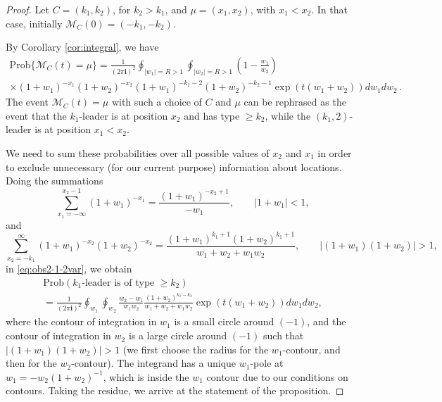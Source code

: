 \documentclass[11pt,reqno]{amsart}
\theoremstyle{definition}
\theoremstyle{remark}
\theoremstyle{remark}
\def\geq{\geqslant}
\renewcommand\ge{\geq}
\def\M{\mathcal M}
\newcommand{\ii}{{\mathbf i}}
\numberwithin{equation}{section}
\begin{document}
	\begin{proof}
		
		Let $C=(k_1, k_2)$, for $k_2>k_1$, and $\mu = (x_1,x_2)$, with $x_1<x_2$. In that case, initially $\M_C(0)= (-k_1, -k_2)$. 
		
		By Corollary \ref{cor:integral}, we have
		\begin{equation}\label{eq:obs2-1-2var}
			\begin{gathered}
				\mathrm{Prob}\{\M_C(t)=\mu\}=\frac{1}{(2\pi \ii)^2} \oint_{|w_1|=R>1} \oint_{|w_2|=R>1} \left(1-\frac{w_1}{w_2}\right) \\ \times (1+w_1)^{-x_1} (1+w_2)^{-x_2} 
				(1+w_1)^{-k_1-2} (1+w_2)^{-k_2-1} \exp (t (w_1+w_2)) d w_1 d w_2 \,.
			\end{gathered}
		\end{equation}
		The event $\M_C(t)=\mu$ with such a choice of $C$ and $\mu$ can be rephrased as the event that the $k_1$-leader is at position $x_2$ and has type $\ge k_2$, while the $(k_1,2)$-leader is at position $x_1<x_2$. 
		
		We need to sum these probabilities over all possible values of $x_2$ and $x_1$ in order to exclude unnecessary (for our current purpose) information about locations. Doing the summations
		\begin{equation}
			\label{eq:obs2-1-3var}
			\sum_{x_1=-\infty}^{x_2-1} (1+w_1)^{-x_1} = \frac{(1+w_1)^{-x_2+1}}{-w_1}, \qquad |1+w_1| <1,
		\end{equation}
		and
		\begin{equation}
			\label{eq:obs2-1-4var}
			\sum_{x_2=-k_1}^{\infty} (1+w_1)^{-x_2} (1+w_2)^{-x_2} = \frac{(1+w_1)^{k_1+1} (1+w_2)^{k_1+1}}{w_1+w_2+w_1 w_2}, \qquad |(1+w_1)(1+w_2)| >1,
		\end{equation}
		in \eqref{eq:obs2-1-2var}, we obtain
		\begin{multline}
			\label{eq:LeaderAsymp-Type2}
			\mathrm{Prob} \left( \mbox{$k_1$-leader is of type $\ge k_2$} \right) \\ = \frac{1}{(2 \pi \ii)^2} \oint_{w_1} \oint_{w_2}
			\frac{w_2-w_1}{w_1 w_2} \frac{(1+w_2)^{k_1-k_2}}{w_1+w_2+w_1 w_2} \exp (t (w_1+w_2)) dw_1 dw_2,
		\end{multline}
		where the contour of integration in $w_1$ is a small circle around $(-1)$, and the contour of integration in $w_2$ is a large circle around $(-1)$ such that $|(1+w_1)(1+w_2)| >1$ (we first choose the radius for the $w_1$-contour, and then for the $w_2$-contour). The integrand has a unique $w_1$-pole at $w_1 = -w_2 (1+w_2)^{-1}$, which is inside the $w_1$ contour due to our conditions on contours. Taking the residue, we arrive at the statement of the proposition.
		
	\end{proof}
\end{document}
